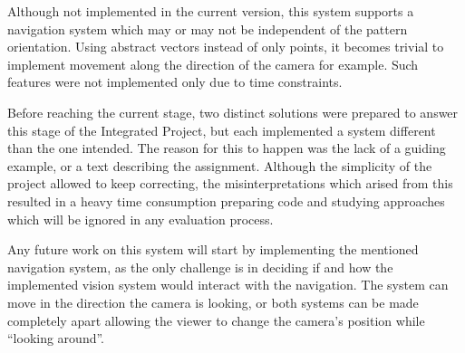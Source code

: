 \documentclass{acmtog}
\begin{document}
Although not implemented in the current version, this system supports a navigation system which may or may not be independent of the pattern orientation. Using abstract vectors instead of only points, it becomes trivial to implement movement along the direction of the camera for example. Such features were not implemented only due to time constraints.

Before reaching the current stage, two distinct solutions were prepared to answer this stage of the Integrated Project, but each implemented a system different than the one intended. The reason for this to happen was the lack of a guiding example, or a text describing the assignment. Although the simplicity of the project allowed to keep correcting, the misinterpretations which arised from this resulted in a heavy time consumption preparing code and studying approaches which will be ignored in any evaluation process.

Any future work on this system will start by implementing the mentioned navigation system, as the only challenge is in deciding if and how the implemented vision system would interact with the navigation. The system can move in the direction the camera is looking, or both systems can be made completely apart allowing the viewer to change the camera's position while ``looking around''.
\end{document}

